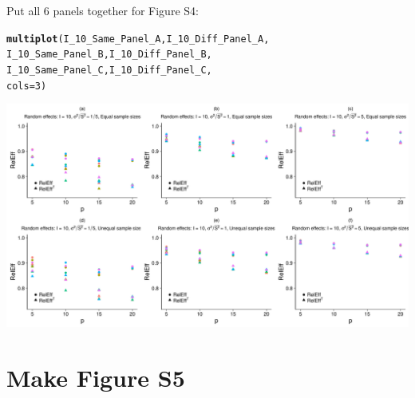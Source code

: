\documentclass{article}\usepackage[]{graphicx}\usepackage[]{color}
\makeatletter
\def\maxwidth{ %
  \ifdim\Gin@nat@width>\linewidth
    \linewidth
  \else
    \Gin@nat@width
  \fi
}
\newcommand{\hlnum}[1]{\textcolor[rgb]{0.686,0.059,0.569}{#1}}%
\newcommand{\hlstd}[1]{\textcolor[rgb]{0.345,0.345,0.345}{#1}}%
\newcommand{\hlkwc}[1]{\textcolor[rgb]{0.333,0.667,0.333}{#1}}%
\newcommand{\hlkwd}[1]{\textcolor[rgb]{0.737,0.353,0.396}{\textbf{#1}}}%
\newenvironment{kframe}{%
 \def\at@end@of@kframe{}%
 \ifinner\ifhmode%
  \def\at@end@of@kframe{\end{minipage}}%
  \begin{minipage}{\columnwidth}%
 \fi\fi%
 \def\FrameCommand##1{\hskip\@totalleftmargin \hskip-\fboxsep
 \colorbox{shadecolor}{##1}\hskip-\fboxsep
     \hskip-\linewidth \hskip-\@totalleftmargin \hskip\columnwidth}%
 \MakeFramed {\advance\hsize-\width
   \@totalleftmargin\z@ \linewidth\hsize
   \@setminipage}}%
 {\par\unskip\endMakeFramed%
 \at@end@of@kframe}
\newenvironment{knitrout}{}{} %
\makeatother
\begin{document}
Put all 6 panels together for Figure S4:

\begin{knitrout}
\color{fgcolor}\begin{kframe}
\begin{alltt}
\hlkwd{multiplot}\hlstd{(I_10_Same_Panel_A, I_10_Diff_Panel_A,}
          \hlstd{I_10_Same_Panel_B, I_10_Diff_Panel_B,}
          \hlstd{I_10_Same_Panel_C, I_10_Diff_Panel_C,}
          \hlkwc{cols}\hlstd{=}\hlnum{3}\hlstd{)}
\end{alltt}


{\ttfamily\noindent\itshape\color{messagecolor}{\#\# Loading required package: grid}}\end{kframe}

{\centering \includegraphics[width=\maxwidth]{figures/Boca_Figure_S4_panels-1} 

}



\end{knitrout}

\section{Make Figure S5}
\end{document}

